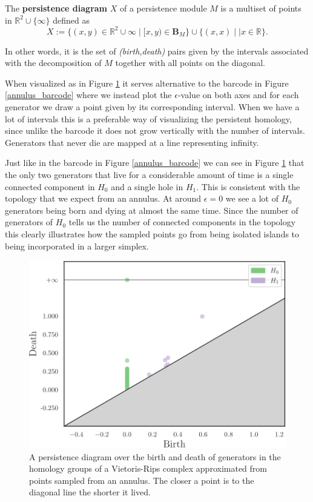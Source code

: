   \begin{definition}
    The \textbf{persistence diagram} $X$ of a persistence module $M$ is a multiset of points in $\mathbb{R}^{2}\cup \{\infty\}$ defined as
    \[
      X:=\{ (x,y) \in \mathbb{R}^{2}\cup{\infty} \mid [x,y) \in \mathbf{B}_{M}\} \cup \{ (x,x) \mid | x \in \mathbb{R}\}.
    \]
  \end{definition}
In other words, it is the set of \textit{(birth,death)} pairs given by the intervals associated with the decomposition of $M$ together with all points on the diagonal.

When visualized as in Figure \ref{pdiagram} it serves alternative to the barcode in Figure \ref{annulus_barcode} where we instead plot the $\epsilon$-value on both axes and for each generator we draw a point given by its corresponding interval. When we have a lot of intervals this is a preferable way of visualizing the persistent homology, since unlike the barcode it does not grow vertically with the number of intervals. Generators that never die are mapped at a line representing infinity.

Just like in the barcode in Figure \ref{annulus_barcode} we can see in Figure \ref{pdiagram} that the only two generators that live for a considerable amount of time is a single connected component in $H_{0}$ and a single hole in $H_{1}$. This is consistent with the topology that we expect from an annulus. At around $\epsilon=0$ we see a lot of $H_{0}$ generators being born and dying at almost the same time. Since the number of generators of $H_{0}$ tells us the number of connected components in the topology this clearly illustrates how the sampled points go from being isolated islands to being incorporated in a larger simplex.
\begin{figure}[ht]
  \centering
  \includegraphics[scale=0.7]{diagram.pdf}
  \caption{\label{pdiagram} A persistence diagram over the birth and death of generators in the homology groups of a Vietoris-Rips complex approximated from points sampled from an annulus. The closer a point is to the diagonal line the shorter it lived. }
\end{figure}


